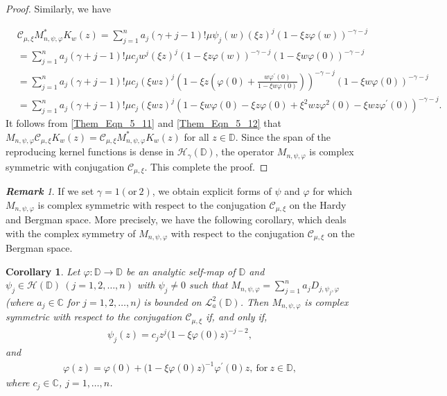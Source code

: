 \documentclass[12pt, reqno]{amsart}
\newtheorem{corollary}[theorem]{Corollary}
\theoremstyle{definition}
\theoremstyle{remark}
\newtheorem{remark}[theorem]{\bf{Remark}}
\numberwithin{equation}{section}
\begin{document}
\begin{proof}
Similarly, we have

\begin{align}\label{Them_Eqn_5_12}
&\mathcal{C}_{\mu, \xi} M_{n,\psi, \varphi}^*K_w(z)
=\displaystyle\sum_{j=1}^{n}a_j(\gamma+j-1)!\mu \psi_j(w)(\xi z)^{j}(1-\xi z\varphi(w))^{-\gamma-j}\nonumber\\
&=\displaystyle\sum_{j=1}^{n}a_j(\gamma+j-1)!\mu c_jw^j(\xi z)^{j}(1-\xi z\varphi(w))^{-\gamma-j}(1-\xi w\varphi(0))^{-\gamma-j}\nonumber\\
&=\displaystyle\sum_{j=1}^{n}a_j(\gamma+j-1)!\mu c_j(\xi wz)^{j}\left(1-\xi z\left(\varphi(0)+\frac{w\varphi^\prime(0)}{1-\xi w\varphi(0)}\right)\right)^{-\gamma-j}(1-\xi w\varphi(0))^{-\gamma-j}\nonumber\\
&=\displaystyle\sum_{j=1}^{n}a_j(\gamma+j-1)!\mu c_j(\xi wz)^{j}\left(1-\xi w\varphi(0)-\xi z\varphi(0)+\xi^2wz\varphi^2(0)-\xi wz\varphi^\prime(0)\right)^{-\gamma-j}.
\end{align}
It follows from \eqref{Them_Eqn_5_11} and \eqref{Them_Eqn_5_12} that $M_{n,\psi, \varphi}\mathcal{C}_{\mu, \xi}K_w(z)
=\mathcal{C}_{\mu, \xi} M_{n,\psi, \varphi}^*K_w(z)$ for all $z\in \mathbb{D}$.
Since the span of the reproducing kernel functions is dense in $\mathcal{H}_\gamma(\mathbb{D})$, the operator $ M_{n,\psi, \varphi}$ is complex symmetric with conjugation $\mathcal{C}_{\mu, \xi}$. This complete the proof.

\end{proof}






\begin{remark}
	If we set $\gamma=1 (\mbox{or}~ 2)$, we obtain explicit forms of $\psi$ and $\varphi$ for which $M_{n,\psi,\varphi}$ is complex symmetric with respect to the conjugation $\mathcal{C}_{\mu, \xi}$ on the Hardy and Bergman space. More precisely, we have the following corollary, which deals with the complex symmetry of $M_{n,\psi,\varphi}$  with respect to the conjugation $\mathcal{C}_{\mu, \xi}$ on the Bergman space.
\end{remark}


\begin{corollary}
	 Let $\varphi: \mathbb{D}\longrightarrow \mathbb{D}$ be an analytic self-map of $\mathbb{D}$ and $\psi_j\in \mathcal{H}(\mathbb{D})~(j=1, 2,\dots, n)$ with $\psi_j \neq 0$ such that $M_{n, \psi, \varphi}=\displaystyle\sum_{j=1}^{n}a_jD_{j,\psi_j, \varphi} $ (where $a_j\in \mathbb{C}$ for $j=1, 2, \dots, n$) is bounded on $\mathcal{L}_a^2(\mathbb{D})$. Then $M_{n,\psi,\varphi}$ is complex symmetric with respect to the conjugation $\mathcal{C}_{\mu, \xi}$ if, and only if,
	\begin{gather*}
	\psi_j(z)=c_jz^{j}\big(1-\xi \varphi(0) z\big)^{-j-2},
	\end{gather*}
	and 
	\begin{gather*}
	\varphi(z)=\varphi(0)+\big(1-\xi \varphi(0) z\big)^{-1}\varphi^{\prime}(0)z,~ \mbox{for}~ z\in \mathbb{D},
	\end{gather*}
	where $c_j\in \mathbb{C}$, $j=1, \dots, n$.
\end{corollary}
\end{document}
